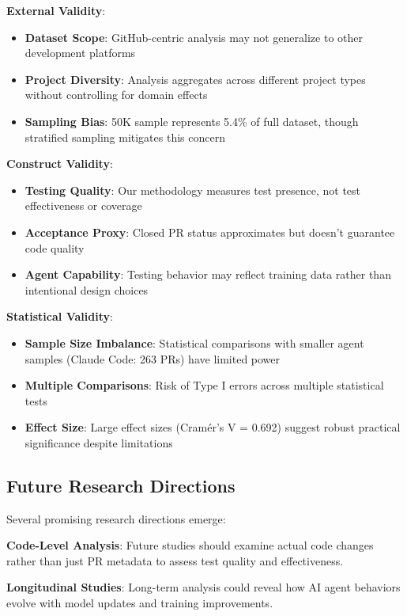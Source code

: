 \documentclass[conference]{IEEEtran}
\begin{document}
{\textbf{External Validity}:
\begin{itemize}
    \item \textbf{Dataset Scope}: GitHub-centric analysis may not generalize to other development platforms
    \item \textbf{Project Diversity}: Analysis aggregates across different project types without controlling for domain effects
    \item \textbf{Sampling Bias}: 50K sample represents 5.4\% of full dataset, though stratified sampling mitigates this concern
\end{itemize}

\textbf{Construct Validity}:
\begin{itemize}
    \item \textbf{Testing Quality}: Our methodology measures test presence, not test effectiveness or coverage
    \item \textbf{Acceptance Proxy}: Closed PR status approximates but doesn't guarantee code quality
    \item \textbf{Agent Capability}: Testing behavior may reflect training data rather than intentional design choices
\end{itemize}

\textbf{Statistical Validity}:
\begin{itemize}
    \item \textbf{Sample Size Imbalance}: Statistical comparisons with smaller agent samples (Claude Code: 263 PRs) have limited power
    \item \textbf{Multiple Comparisons}: Risk of Type I errors across multiple statistical tests
    \item \textbf{Effect Size}: Large effect sizes (Cramér's V = 0.692) suggest robust practical significance despite limitations
\end{itemize}

\subsection{Future Research Directions}

Several promising research directions emerge:

\textbf{Code-Level Analysis}: Future studies should examine actual code changes rather than just PR metadata to assess test quality and effectiveness.

\textbf{Longitudinal Studies}: Long-term analysis could reveal how AI agent behaviors evolve with model updates and training improvements.

}
\end{document}
